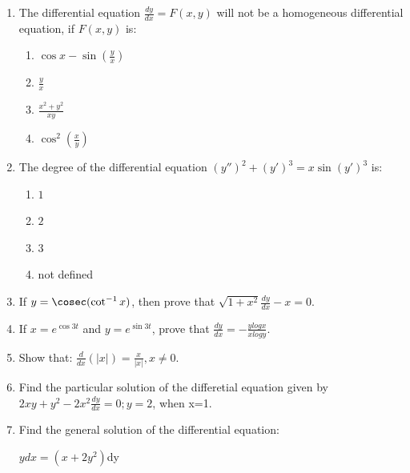 \begin{enumerate}
	\item The differential equation $\frac{dy}{dx}=F(x,y)$ will not be a homogeneous differential equation, if $F(x,y)$ is:
		\begin{enumerate}
			\item $\cos x - \sin (\frac{y}{x})$
			\item $\frac{y}{x}$
			\item $\frac{x^{2} + y^{2}}{xy}$
			\item $\cos^{2}(\frac{x}{y})$
		\end{enumerate}
	\item The degree of the differential equation $(y'')^{2} + (y')^{3} = x\sin(y')^{3}$ is:
		\begin{enumerate}
			\item $1$
			\item $2$
			\item $3$
			\item not defined
		\end{enumerate}
	\item If $y=\cosec (\cot^{-1} x)$, then prove that $\sqrt{1 + x^{2}} \frac{dy}{dx} -x = 0$.
	\item If $x=e^{\cos 3t}$ and $y=e^{\sin 3t}$, prove that $\frac{dy}{dx} = -\frac{ylogx}{xlogy}$.
	\item Show that: $\frac{d}{dx} (|x|)=\frac{x}{|x|}, x\neq0$.
	\item  Find the particular solution of the differetial equation given by $2xy + y^{2} - 2x^{2} \frac{dy}{dx} = 0; y=2$, when x=1.
	\item Find the general solution of the differential equation:\\
		\centerline {$ydx = (x + 2y^{2})$dy}
\end{enumerate}

